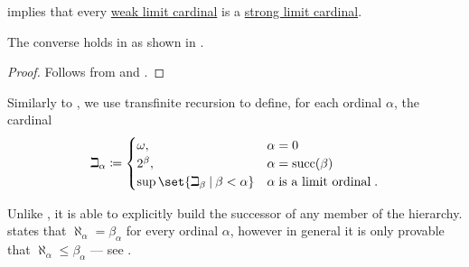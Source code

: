 \begin{corollary}\label{thm:limit_cardinals_and_gch}
   implies that every \hyperref[def:successor_and_limit_cardinal/weak_limit]{weak limit cardinal} is a \hyperref[def:successor_and_limit_cardinal/strong_limit]{strong limit cardinal}.

  The converse holds in  as shown in .
\end{corollary}
\begin{proof}
  Follows from  and .
\end{proof}

\begin{definition}\label{def:beth_hierarchy}
  Similarly to , we use transfinite recursion to define, for each ordinal \( \alpha \), the cardinal
  \begin{equation}\label{eq:def:beth_hierarchy}
    \beth_\alpha \coloneqq \begin{cases}
      \omega,                                       &\alpha = 0 \\
      2^\beta,                                      &\alpha = \op{succ}(\beta) \\
      \sup\set{ \beth_\beta \given \beta < \alpha } &\alpha \T{is a limit ordinal}.
    \end{cases}
  \end{equation}

  Unlike , it is able to explicitly build the successor of any member of the hierarchy.  states that \( \aleph_\alpha = \beta_\alpha \) for every ordinal \( \alpha \), however in general it is only provable that \( \aleph_\alpha \leq \beta_\alpha \) --- see .
\end{definition}
